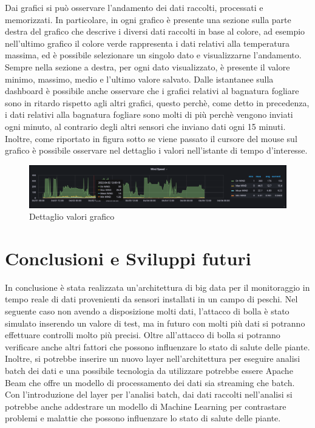 \documentclass{article}
\begin{document}
\noindent
Dai grafici si può osservare l'andamento dei dati raccolti, processati e memorizzati. In particolare, in ogni grafico è presente una sezione sulla parte destra del grafico che descrive i diversi dati raccolti in base al colore, ad esempio nell'ultimo grafico il colore verde rappresenta i dati relativi alla temperatura massima, ed è possibile selezionare un singolo dato e visualizzarne l'andamento. Sempre nella sezione a destra, per ogni dato visualizzato, è presente il valore minimo, massimo, medio e l'ultimo valore salvato.
Dalle istantanee sulla dashboard è possibile anche osservare che i grafici relativi al bagnatura fogliare sono in ritardo rispetto agli altri grafici, questo perchè, come detto in precedenza, i dati relativi alla bagnatura fogliare sono molti di più perchè vengono inviati ogni minuto, al contrario degli altri sensori che inviano dati ogni 15 minuti. \\
Inoltre, come riportato in figura sotto se viene passato il cursore del mouse sul grafico è possibile osservare nel dettaglio i valori nell'istante di tempo d'interesse.

\medskip
\begin{figure}[H]
\includegraphics[width=1\linewidth]{Focus-Graph}
\centering
\caption*{Dettaglio valori grafico}
\label{fig:bytepost}
\end{figure}

\newpage

\section{Conclusioni e Sviluppi futuri}
In conclusione è stata realizzata un'architettura di big data per il monitoraggio in tempo reale di dati provenienti da sensori installati in un campo di peschi. Nel seguente caso non avendo a disposizione molti dati, l'attacco di bolla è stato simulato inserendo un valore di test, ma in futuro con molti più dati si potranno effettuare controlli molto più precisi. Oltre all'attacco di bolla si potranno verificare anche altri fattori che possono influenzare lo stato di salute delle piante.\\
Inoltre, si potrebbe inserire un nuovo layer nell'architettura per eseguire analisi batch dei dati e una possibile tecnologia da utilizzare potrebbe essere Apache Beam che offre un modello di processamento dei dati sia streaming che batch. \\
Con l'introduzione del layer per l'analisi batch, dai dati raccolti nell'analisi si potrebbe anche addestrare un modello di Machine Learning per contrastare problemi e malattie che possono influenzare lo stato di salute delle piante.
\end{document}
